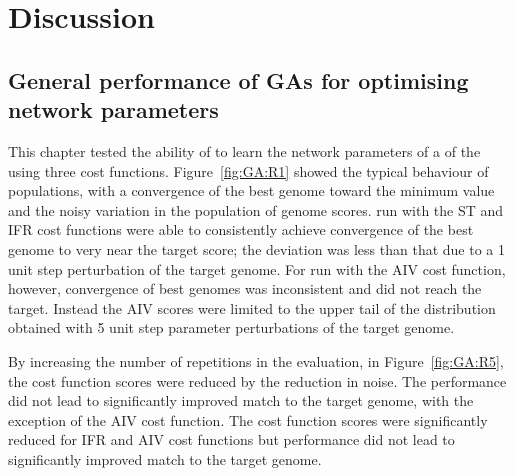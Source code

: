 



\section{Discussion}\label{sec:GA:discussion}

\subsection[General performance of {GA}s]{General performance of {GA}s for optimising network
  parameters}\label{sec:GA:general-perf-disc}

This chapter tested the ability of {\GAs} to learn the network
parameters of a  of the {\CN} using three cost
functions. Figure~\ref{fig:GA:R1} showed the typical behaviour of {\GA}
populations, with a convergence of the best genome toward the minimum value
and the noisy variation in the population of genome scores. {\GAs} run with
the ST and IFR cost functions were able to consistently achieve convergence
of the best genome to very near the target score; the deviation was less
than that due to a 1 unit step perturbation of the target genome. For
{\GAs} run with the AIV cost function, however, convergence of best genomes
was inconsistent and did not reach the target. Instead the AIV scores were
limited to the upper tail of the distribution obtained with 5 unit step
parameter perturbations of the target genome.

\smallskip{}

By increasing the number of repetitions in the {\GA} evaluation, in
Figure~\ref{fig:GA:R5}, the cost function scores were reduced by the
reduction in noise. The {\GA} performance did not lead to significantly
improved match to the target genome, with the exception of the AIV cost
function.  The cost function scores were significantly reduced for IFR and
AIV cost functions but {\GA} performance did not lead to significantly
improved match to the target genome.


\smallskip{}

